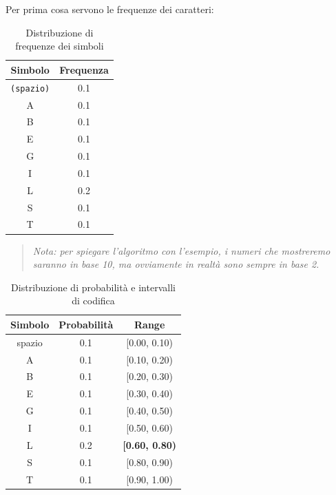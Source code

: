 Per prima cosa servono le frequenze dei caratteri:
\begin{table}[htbp]
\centering
\begin{tabular}{|c|c|}
\hline
\textbf{Simbolo} & \textbf{Frequenza} \\
\hline
\texttt{(spazio)} & 0.1 \\
A & 0.1 \\
B & 0.1 \\
E & 0.1 \\
G & 0.1 \\
I & 0.1 \\
L & 0.2 \\
S & 0.1 \\
T & 0.1 \\
\hline
\end{tabular}
\caption{Distribuzione di frequenze dei simboli}
\end{table}

\begin{quote}
\textit{Nota: per spiegare l'algoritmo con l'esempio, i numeri che mostreremo saranno in base 10, ma ovviamente in realtà sono sempre in base 2.}
\end{quote}

\begin{table}[ht]
\centering
\begin{tabular}{|c|c|c|}
\hline
\textbf{Simbolo} & \textbf{Probabilità} & \textbf{Range} \\
\hline
spazio & 0.1 & [0.00, 0.10) \\
A      & 0.1 & [0.10, 0.20) \\
B      & 0.1 & [0.20, 0.30) \\
E      & 0.1 & [0.30, 0.40) \\
G      & 0.1 & [0.40, 0.50) \\
I      & 0.1 & [0.50, 0.60) \\
L      & 0.2 & \textbf{[0.60, 0.80)} \\
S      & 0.1 & [0.80, 0.90) \\
T      & 0.1 & [0.90, 1.00) \\
\hline
\end{tabular}
\caption{Distribuzione di probabilità e intervalli di codifica}
\end{table}





